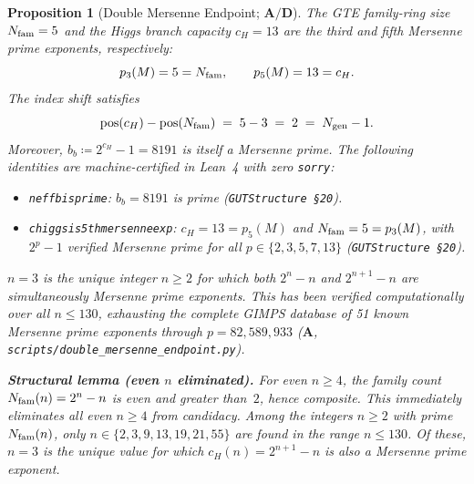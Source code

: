 \documentclass[11pt]{article}
\newtheorem{proposition}[theorem]{Proposition}
\theoremstyle{remark}
\newcommand{\Ngen}{N_{\rm gen}}
\newcommand{\Nfam}{N_{\rm fam}}
\newcommand{\cH}{c_H}
\newcommand{\lean}[1]{%
  \penalty-100
  \begingroup\def\_{\textunderscore\allowbreak}\texttt{#1}\endgroup}
\newcommand{\CatA}{\textbf{A}}
\newcommand{\CatAD}{\textbf{A/D}}
\begin{document}
\begin{proposition}[Double Mersenne Endpoint; $\CatAD$]
\label{prop:double_mersenne}
The GTE family-ring size $\Nfam = 5$ and the Higgs branch capacity $\cH = 13$ are the
third and fifth Mersenne prime exponents, respectively:
\[
  p_3(M) = 5 = \Nfam, \qquad p_5(M) = 13 = \cH.
\]
The index shift satisfies
\[
  \mathrm{pos}(\cH) - \mathrm{pos}(\Nfam) \;=\; 5 - 3 \;=\; 2 \;=\; \Ngen - 1.
\]
Moreover, $b_b \coloneqq 2^{\cH} - 1 = 8191$ is itself a Mersenne prime.
The following identities are machine-certified in Lean~4 with zero \texttt{sorry}:
\begin{itemize}
  \item \lean{neff\_b\_is\_prime}: $b_b = 8191$ is prime
    (\texttt{GUTStructure~\S20}).
  \item \lean{chiggs\_is\_5th\_mersenne\_exp}: $\cH = 13 = p_5(M)$ and $\Nfam = 5 = p_3(M)$,
    with $2^p - 1$ verified Mersenne prime for all $p \in \{2,3,5,7,13\}$
    (\texttt{GUTStructure~\S20}).
\end{itemize}
$n = 3$ is the unique integer $n \geq 2$ for which \emph{both}
$2^n - n$ and $2^{n+1} - n$ are simultaneously Mersenne prime exponents.
This has been verified computationally over all $n \leq 130$, exhausting the complete
GIMPS database of 51 known Mersenne prime exponents through $p = 82{,}589{,}933$
($\CatA$, \texttt{scripts/double\_mersenne\_endpoint.py}).

\medskip

\textbf{Structural lemma (even $n$ eliminated).}
For even $n \geq 4$, the family count $\Nfam(n) = 2^n - n$ is even and greater
than~$2$, hence composite.  This immediately eliminates all even $n \geq 4$ from
candidacy.  Among the integers $n \geq 2$ with prime $\Nfam(n)$, only
$n \in \{2, 3, 9, 13, 19, 21, 55\}$ are found in the range $n \leq 130$.
Of these, $n = 3$ is the unique value for which $\cH(n) = 2^{n+1} - n$ is also a
Mersenne prime exponent.


\end{proposition}
\end{document}
